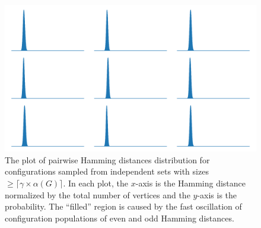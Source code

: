 \documentclass[onefignum, onetabnum]{siamart190516}
\newcommand{\<}{\langle}
\renewcommand{\>}{\rangle}
\begin{document}
\begin{figure} 
    \includegraphics[width=\textwidth, trim={0.0cm 1cm 0.0cm 0cm}, clip]{figures/fig6.pdf}
    \caption{The plot of pairwise Hamming distances distribution for configurations sampled from independent sets with sizes $\geq \lceil\gamma \times \alpha(G)\rceil$.
    In each plot, the $x$-axis is the Hamming distance normalized by the total number of vertices and the $y$-axis is the probability.
    The ``filled'' region is caused by the fast oscillation of configuration populations of even and odd Hamming distances.
    }
    \label{fig:hamming}
\end{figure}

\end{document}
